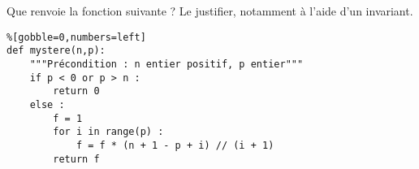 \exer{}
\setcounter{numques}{0}

Que renvoie la fonction suivante ? Le justifier, notamment à l'aide d'un invariant. 
\begin{lstlisting}
%[gobble=0,numbers=left]
def mystere(n,p):
    """Précondition : n entier positif, p entier"""
    if p < 0 or p > n : 
        return 0
    else : 
        f = 1
        for i in range(p) : 
            f = f * (n + 1 - p + i) // (i + 1)
        return f
\end{lstlisting}

